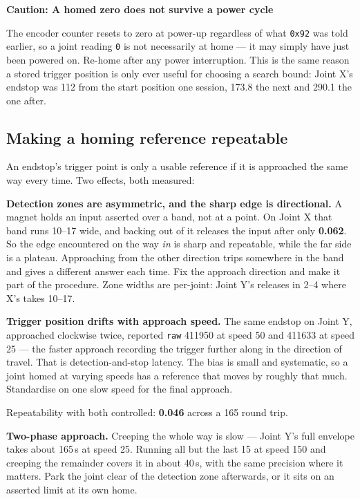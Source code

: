 \documentclass[11pt,letterpaper]{article}
\newenvironment{caution}[1]{%
    \par\addvspace{8pt}%
    \noindent{\color{cautionred}\rule{\linewidth}{0.8pt}}\par\vspace{2pt}
    \noindent\textbf{\color{cautionred}Caution: #1}\par\vspace{2pt}
}{%
    \par\vspace{2pt}\noindent{\color{cautionred}\rule{\linewidth}{0.4pt}}%
    \par\addvspace{8pt}%
}
\begin{document}
\begin{caution}{A homed zero does not survive a power cycle}
The encoder counter resets to zero at power-up regardless of what \texttt{0x92}
was told earlier, so a joint reading \texttt{0} is not necessarily at home ---
it may simply have just been powered on. Re-home after any power interruption.
This is the same reason a stored trigger position is only ever useful for
choosing a search bound: Joint X's endstop was 112\textdegree{} from the start
position one session, 173.8\textdegree{} the next and 290.1\textdegree{} the
one after.
\end{caution}

\subsection{Making a homing reference repeatable}
An endstop's trigger point is only a usable reference if it is approached the same
way every time. Two effects, both measured:

\textbf{Detection zones are asymmetric, and the sharp edge is directional.} A
magnet holds an input asserted over a band, not at a point. On Joint X that band
runs 10--17\textdegree{} wide, and backing out of it releases the input after only
\textbf{0.062\textdegree{}}. So the edge encountered on the way \emph{in} is
sharp and repeatable, while the far side is a plateau. Approaching from the other
direction trips somewhere in the band and gives a different answer each time.
Fix the approach direction and make it part of the procedure. Zone widths are
per-joint: Joint Y's releases in 2--4\textdegree{} where X's takes 10--17.

\textbf{Trigger position drifts with approach speed.} The same endstop on Joint Y,
approached clockwise twice, reported \texttt{raw} 411950 at speed 50 and 411633 at
speed 25 --- the faster approach recording the trigger further along in the
direction of travel. That is detection-and-stop latency. The bias is small and
systematic, so a joint homed at varying speeds has a reference that moves by
roughly that much. Standardise on one slow speed for the final approach.

Repeatability with both controlled: \textbf{0.046\textdegree{}} across a
165\textdegree{} round trip.

\textbf{Two-phase approach.} Creeping the whole way is slow --- Joint Y's full
envelope takes about 165\,s at speed 25. Running all but the last
15\textdegree{} at speed 150 and creeping the remainder covers it in about
40\,s, with the same precision where it matters. Park the joint clear of the
detection zone afterwards, or it sits on an asserted limit at its own home.
\end{document}
